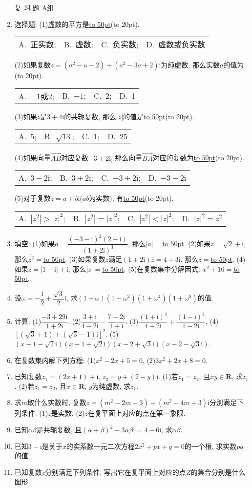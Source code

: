 \documentclass[10pt,a4paper]{article}
\newcommand{\blank}[1]{\underline{\hbox to #1pt{}}}
\newcommand{\bracket}[1]{(\hbox to #1pt{})}
\newcommand{\fourch}[4]{\par\begin{tabular}{p{.23\textwidth}p{.23\textwidth}p{.23\textwidth}p{.23\textwidth}}
A.~#1 &B.~#2& C.~#3& D.~#4
\end{tabular}}
\begin{document}
\begin{enumerate}[1.]
复 习 题
A组
\item 选择题:
(1)虚数的平方是\blank{50}\bracket{20}.
\fourch{正实数;}{虚数;}{负实数;}{虚数或负实数}
(2)如果复数$z=(a^2-a-2)+(a^2-3a+2)\mathrm{i}$为纯虚数, 那么实数$a$的值为    \bracket{20}.
\fourch{$-1$或2;}{$-1$;}{2;}{1}
(3)如果$z$是$3+4\mathrm{i}$的共轭复数, 那么$|z|$的值是\blank{50}\bracket{20}.
\fourch{5;}{$\sqrt {13}$;}{1;}{25}
(4)如果向量$\overrightarrow{AB}$对应复数$-3+2\mathrm{i}$, 那么向量$\overrightarrow{BA}$对应的复数为\blank{50}\bracket{20}.
\fourch{$3-2\mathrm{i}$;}{$3+2\mathrm{i}$;}{$-3+2\mathrm{i}$;}{$-3-2\mathrm{i}$}
(5)对于复数$z=a+b\mathrm{i}$($ab$为实数), 有\blank{50}\bracket{20}.
\fourch{$|z^2|>|z|^2$;}{$|z^2|=|z|^2$;}{$|z^2|<|z|^2$;}{$|z|^2=z^2$}
\item 填空:
(1)如果$a=\dfrac{{{(-3-\mathrm{i})}^2}(2-\mathrm{i})}{{{(1+2\mathrm{i})}^3}}$, 那么$|a|=$\blank{50}.
(2)如果$z=\sqrt 2+\mathrm{i}$, 那么$\overline {z^2}=$\blank{50}.
(3)如果复数$z$满足$(1+2\mathrm{i})\overline  z=4+3\mathrm{i}$, 那么$z=$\blank{50}.
(4)如果$z=|1-\mathrm{i}|+\mathrm{i}$, 那么$|z|=$\blank{50}.
(5)在复数集中分解因式: $x^2+16=$\blank{50}.
\item 设$\omega =-\dfrac 12+\dfrac{\sqrt 3}2\mathrm{i}$, 求$(1+\omega)(1+\omega ^2)(1+\omega ^4)(1+\omega ^8)$的值.
\item 计算:
(1)$\dfrac{-3+29\mathrm{i}}{1+2\mathrm{i}}$.							(2)$\dfrac{3+\mathrm{i}}{4-2\mathrm{i}}-\dfrac{7-2\mathrm{i}}{1+\mathrm{i}}$.
(3)$\dfrac{{{(1+\mathrm{i})}^4}}{1+2\mathrm{i}}+\dfrac{{{(1-\mathrm{i})}^4}}{1-2\mathrm{i}}$.					(4)$[(\sqrt 3+1)+(\sqrt 3-1)\mathrm{i}]^2$.
(5)$(x-1-\sqrt 2\mathrm{i})(x-1+\sqrt 2\mathrm{i})(x-2+\sqrt 3\mathrm{i})(x-2-\sqrt 3\mathrm{i})$.
\item 在复数集内解下列方程:
(1)$x^2-2x+5=0$.						(2)$3x^2+2x+8=0$.
\item 已知复数$z_1=(2x+1)+\mathrm{i}$, $z_2=y+(2-y)\mathrm{i}$.
(1)若$z_1=z_2$, 且$xy\in \mathbf{R}$, 求$z_1$.
(2)若$z_1=z_2$, 且$x\in \mathbf{R}$, $y$为纯虚数, 求$z_1$.
\item 求$m$取什么实数时, 复数$z=(m^2-2m-3)+(m^2-4m+3)\mathrm{i}$分别满足下列条件.
(1)$z$是实数.
(2)$z$在复平面上对应的点在第一象限.
\item 已知$\alpha \beta$是共轭复数, 且$(\alpha +\beta)^2-3\alpha \beta \mathrm{i}=4-6\mathrm{i}$, 求$\alpha \beta$.
\item 已知$3-\mathrm{i}$是关于$x$的实系数一元二次方程$2x^2+px+q=0$的一个根, 求实数$pq$的值.
\item 已知复数$z$分别满足下列条件, 写出它在复平面上对应的点$Z$的集合分别是什么图形.

\end{enumerate}
\end{document}
